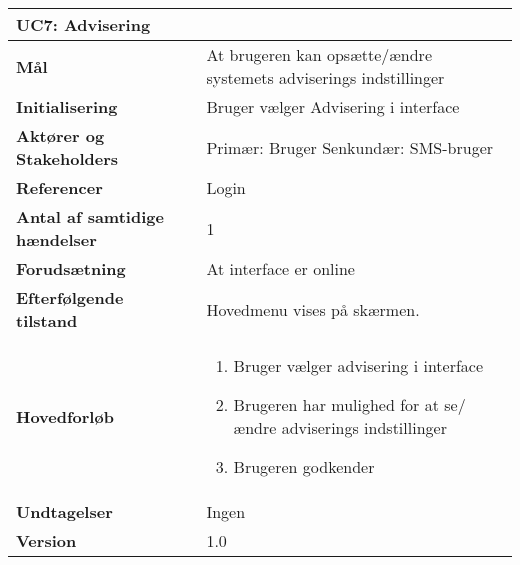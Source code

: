 \begin{table}[H] \centering
\begin{tabular}{|p{6cm}|p{8cm}|}
	\hline
\multicolumn{2}{|l|}{\textbf{UC7: Advisering}} \\\hline
\textbf{Mål}								
&At brugeren kan opsætte/ændre systemets adviserings indstillinger
 \\\hline
\textbf{Initialisering}					
&Bruger vælger Advisering i interface
 \\\hline
\textbf{Aktører og Stakeholders}			
&Primær: Bruger Senkundær: SMS-bruger
 \\\hline
\textbf{Referencer}						
&Login
 \\\hline
\textbf{Antal af samtidige hændelser}	
&1
 \\\hline
\textbf{Forudsætning}					
&At interface er online
 \\\hline
\textbf{Efterfølgende tilstand}			
&Hovedmenu vises på skærmen.
 \\\hline
\textbf{Hovedforløb}						
& 
\begin{enumerate}

\item Bruger vælger advisering i interface

\item Brugeren har mulighed for at se/ændre adviserings indstillinger

\item Brugeren godkender
 
\end{enumerate}
 \\\hline
 
\textbf{Undtagelser} &Ingen \\\hline
		\textbf{Version}		&1.0 \\\hline
	\end{tabular}
	\label{UC7} 
\end{table}